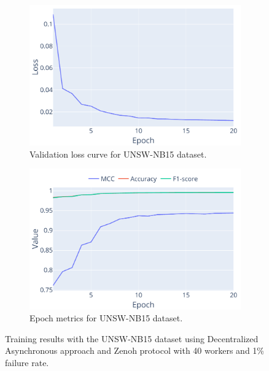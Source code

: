 \begin{figure}[!htb]
    \centering
    \begin{subfigure}[b]{0.49\linewidth}
        \centering
        \includegraphics[width=\linewidth]{figs/scenario3/unsw_loss.pdf}
        \caption{Validation loss curve for UNSW-NB15 dataset.}
        \label{fig:scenario3_unsw_loss}
    \end{subfigure}
    \hfill
    \begin{subfigure}[b]{0.49\linewidth}
        \centering
        \includegraphics[width=\linewidth]{figs/scenario3/unsw_metrics.pdf}
        \caption{Epoch metrics for UNSW-NB15 dataset.}
        \label{fig:scenario3_unsw_metrics}
    \end{subfigure}
    \caption[UNSW-NB15 Training Results with Decentralized Asynchronous FL]{Training results with the UNSW-NB15 dataset using Decentralized Asynchronous approach and Zenoh protocol with 40 workers and 1\% failure rate.}
    \label{fig:scenario3_unsw_results}
\end{figure}


